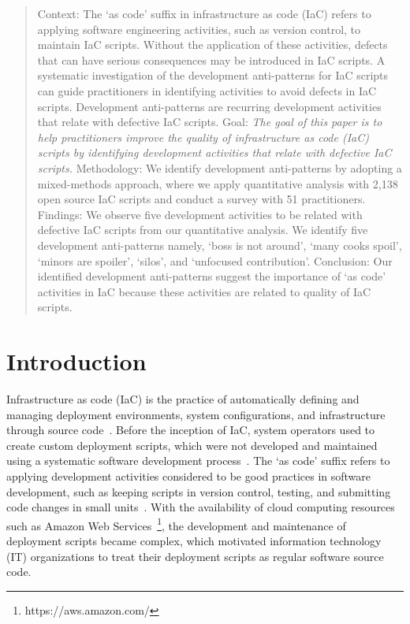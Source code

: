\documentclass[smallextended]{svjour3}       %
\begin{document}
\begin{abstract}

Context: The `as code' suffix in infrastructure as code (IaC) refers to applying software engineering activities, such as version control, to maintain IaC scripts. Without the application of these activities, defects that can have serious consequences may be introduced in IaC scripts. A systematic investigation of the development anti-patterns for IaC scripts can guide practitioners in identifying activities to avoid defects in IaC scripts. Development anti-patterns are recurring development activities that relate with defective IaC scripts. Goal: \textit{The goal of this paper is to help practitioners improve the quality of infrastructure as code (IaC) scripts by identifying development activities that relate with defective IaC scripts.} Methodology: We identify development anti-patterns by adopting a mixed-methods approach, where we apply quantitative analysis with 2,138 open source IaC scripts and conduct a survey with 51 practitioners. Findings: We observe five development activities to be related with defective IaC scripts from our quantitative analysis. We identify five development anti-patterns namely, `boss is not around', `many cooks spoil', `minors are spoiler', `silos', and `unfocused contribution'. Conclusion: Our identified development anti-patterns suggest the importance of `as code' activities in IaC because these activities are related to quality of IaC scripts.  



\end{abstract}

\section{Introduction}
\label{intro}

Infrastructure as code (IaC) is the practice of automatically defining and managing deployment environments, system configurations, and infrastructure through source code~\citep{Humble:2010:CD}. Before the inception of IaC, system operators used to create custom deployment scripts, which were not developed and maintained using a systematic software development process~\citep{pulling:strings:puppet:book}. The `as code' suffix refers to applying development activities considered to be good practices in software development, such as keeping scripts in version control, testing, and submitting code changes in small units~\citep{kief:iac:book}. With the availability of cloud computing resources such as Amazon Web Services~\footnote{https://aws.amazon.com/}, the development and maintenance of deployment scripts became complex, which motivated information technology (IT) organizations to treat their deployment scripts as regular software source code.  
\end{document}
